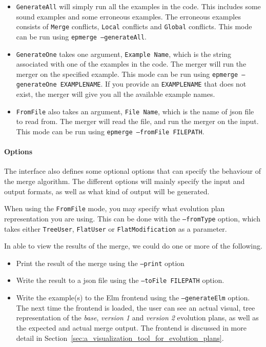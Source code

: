 \documentclass[a4paper,english]{ifimaster}
\begin{document}
\begin{itemize}
\item \texttt{GenerateAll} will simply run all the examples in the code. This includes some sound examples and some erroneous examples. The erroneous examples consists of \texttt{Merge} conflicts, \texttt{Local} conflicts and \texttt{Global} conflicts. This mode can be run using \texttt{epmerge --generateAll}.
\item \texttt{GenerateOne} takes one argument, \texttt{Example Name}, which is the string associated with one of the examples in the code. The merger will run the merger on the specified example. This mode can be run using \texttt{epmerge --generateOne EXAMPLENAME}. If you provide an \texttt{EXAMPLENAME} that does not exist, the merger will give you all the available example names.
\item \texttt{FromFile} also takes an argument, \texttt{File Name}, which is the name of json file to read from. The merger will read the file, and run the merger on the input. This mode can be run using \texttt{epmerge --fromFile FILEPATH}.
\end{itemize}

\paragraph{Options}%
\label{par:options}

The interface also defines some optional options that can specify the behaviour of the merge algorithm. The different options will mainly specify the input and output formats, as well as what kind of output will be generated.

When using the \texttt{FromFile} mode, you may specify what evolution plan representation you are using. This can be done with the \texttt{--fromType} option, which takes either \texttt{TreeUser}, \texttt{FlatUser} or \texttt{FlatModification} as a parameter.

In able to view the results of the merge, we could do one or more of the following.

\begin{itemize}
  \item Print the result of the merge using the \texttt{--print} option
  \item Write the result to a json file using the \texttt{--toFile FILEPATH} option.
  \item Write the example(s) to the Elm frontend using the \texttt{--generateElm} option. The next time the frontend is loaded, the user can see an actual visual, tree representation of the \textit{base}, \textit{version 1} and \textit{version 2} evolution plans, as well as the expected and actual merge output. The frontend is discussed in more detail in Section~\vref{sec:a_visualization_tool_for_evolution_plans}.
\end{itemize}
\end{document}

